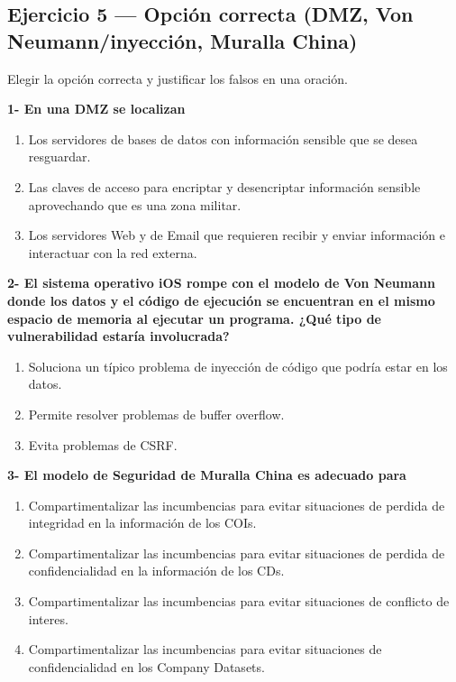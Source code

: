 \subsection{Ejercicio 5 — Opción correcta (DMZ, Von Neumann/inyección, Muralla China)}

\begin{consigna}
Elegir la opción correcta y justificar los falsos en una oración.

\textbf{1- En una DMZ se localizan}
\begin{enumerate}[label=(\alph*)]
  \item Los servidores de bases de datos con información sensible que se desea resguardar.
  \item Las claves de acceso para encriptar y desencriptar información sensible aprovechando que
        es una zona militar.
  \item Los servidores Web y de Email que requieren recibir y enviar información e interactuar
        con la red externa.
\end{enumerate}

\textbf{2- El sistema operativo iOS rompe con el modelo de Von Neumann donde los datos y el
código de ejecución se encuentran en el mismo espacio de memoria al ejecutar un programa. ¿Qué
tipo de vulnerabilidad estaría involucrada?}
\begin{enumerate}[label=(\alph*)]
  \item Soluciona un típico problema de inyección de código que podría estar en los datos.
  \item Permite resolver problemas de buffer overflow.
  \item Evita problemas de CSRF.
\end{enumerate}

\textbf{3- El modelo de Seguridad de Muralla China es adecuado para}
\begin{enumerate}[label=(\alph*)]
  \item Compartimentalizar las incumbencias para evitar situaciones de perdida de integridad en
        la información de los COIs.
  \item Compartimentalizar las incumbencias para evitar situaciones de perdida de
        confidencialidad en la información de los CDs.
  \item Compartimentalizar las incumbencias para evitar situaciones de conflicto de interes.
  \item Compartimentalizar las incumbencias para evitar situaciones de confidencialidad en los
        Company Datasets.
\end{enumerate}
\end{consigna}

